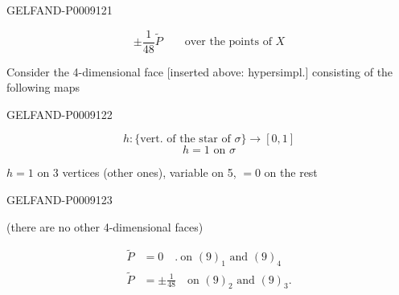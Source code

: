 \begin{GelfandAdjacentEvidence}{GELFAND-P000912}{1}

\begin{equation*}
 \pm\frac{1}{48}\widetilde P
 \qquad\text{over the points of }X
\end{equation*}

Consider the 4-dimensional face [inserted above: hypersimpl.] consisting of the following maps
\end{GelfandAdjacentEvidence}
\begin{GelfandAdjacentEvidence}{GELFAND-P000912}{2}

\begin{equation*}
 h:\{\text{vert. of the star of }\sigma\}\longrightarrow[0,1]
\end{equation*}
\begin{equation*}
 h=1\text{ on }\sigma
\end{equation*}

$h=1$ on 3 vertices (other ones), variable on 5, $=0$ on the rest

\end{GelfandAdjacentEvidence}
\begin{GelfandAdjacentEvidence}{GELFAND-P000912}{3}


(there are no other 4-dimensional faces)

\begin{align*}
 \widetilde P&=0\quad .\ \text{on }(9)_1\text{ and }(9)_4\\
 \widetilde P&=\pm\frac{1}{48}\quad\text{on }(9)_2\text{ and }(9)_3.
\end{align*}
\end{GelfandAdjacentEvidence}
